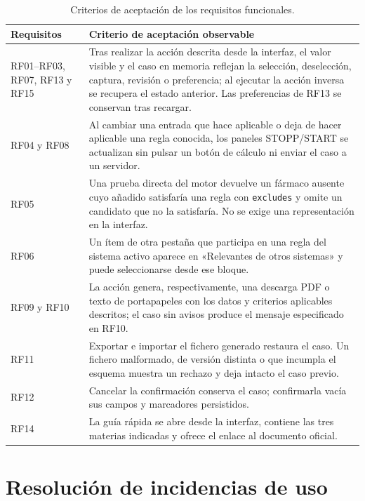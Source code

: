 \begin{table}[H]
  \centering
  \scriptsize
  \begin{tabular}{@{}lp{11.1cm}@{}}
    \toprule
    \textbf{Requisitos} & \textbf{Criterio de aceptación observable} \\
    \midrule
    RF01--RF03, RF07, RF13 y RF15 &
      Tras realizar la acción descrita desde la interfaz, el valor visible
      y el caso en memoria reflejan la selección, deselección, captura,
      revisión o preferencia; al ejecutar la acción inversa se recupera el
      estado anterior. Las preferencias de RF13 se conservan tras recargar. \\
    RF04 y RF08 &
      Al cambiar una entrada que hace aplicable o deja de hacer aplicable
      una regla conocida, los paneles STOPP/START se actualizan sin pulsar
      un botón de cálculo ni enviar el caso a un servidor. \\
    RF05 &
      Una prueba directa del motor devuelve un fármaco ausente cuyo añadido
      satisfaría una regla con \texttt{excludes} y omite un candidato que no
      la satisfaría. No se exige una representación en la interfaz. \\
    RF06 &
      Un ítem de otra pestaña que participa en una regla del sistema activo
      aparece en «Relevantes de otros sistemas» y puede seleccionarse desde
      ese bloque. \\
    RF09 y RF10 &
      La acción genera, respectivamente, una descarga PDF o texto de
      portapapeles con los datos y criterios aplicables descritos; el caso
      sin avisos produce el mensaje especificado en RF10. \\
    RF11 &
      Exportar e importar el fichero generado restaura el caso. Un fichero
      malformado, de versión distinta o que incumpla el esquema muestra un
      rechazo y deja intacto el caso previo. \\
    RF12 &
      Cancelar la confirmación conserva el caso; confirmarla vacía sus
      campos y marcadores persistidos. \\
    RF14 &
      La guía rápida se abre desde la interfaz, contiene las tres materias
      indicadas y ofrece el enlace al documento oficial. \\
    \bottomrule
  \end{tabular}
  \caption{Criterios de aceptación de los requisitos funcionales.}
  \label{tab:aceptacion-rf}
\end{table}

\chapter{Resolución de incidencias de uso}
\label{anexo:errores-uso}

